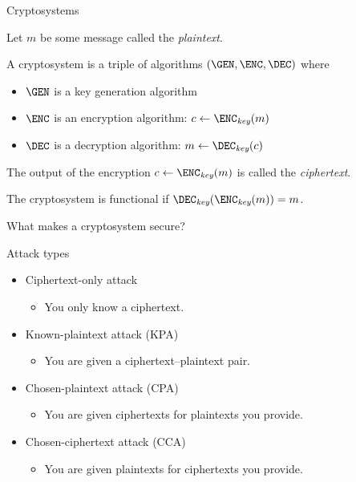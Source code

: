 \begin{frame}{Cryptosystems}

  \pause
  Let $m$ be some message called the \emph{plaintext}.

  \vspace*{1em}

  \pause
  A cryptosystem is a triple of algorithms $(\GEN,\ENC,\DEC)$ where
  \begin{itemize}[<+(1)->]
    \item $\GEN$ is a key generation algorithm
    \item $\ENC$ is an encryption algorithm: $c\gets\ENC_{\textit{key}}(m)$
    \item $\DEC$ is a decryption algorithm: $m\gets\DEC_{\textit{key}}(c)$
  \end{itemize}

  \vspace*{1em}

  \pause
  The output of the encryption $c\gets\ENC_{\textit{key}}(m)$ is called the \emph{ciphertext}.

  \vspace*{1em}

  \pause
  The cryptosystem is functional if $\DEC_{\textit{key}}(\ENC_{\textit{key}}(m))=m$.
\end{frame}

\begin{frame}[c]
  \centering
  What makes a cryptosystem secure?
\end{frame}

\begin{frame}{Attack types}

  \begin{itemize}[<+(1)->]
    \item Ciphertext-only attack
    \begin{itemize}
      \item You only know a ciphertext.
    \end{itemize}
    \item Known-plaintext attack (KPA)
    \begin{itemize}
      \item You are given a ciphertext--plaintext pair.
    \end{itemize}
    \item Chosen-plaintext attack (CPA)
    \begin{itemize}
      \item You are given ciphertexts for plaintexts you provide.
    \end{itemize}
    \item Chosen-ciphertext attack (CCA)
    \begin{itemize}
      \item You are given plaintexts for ciphertexts you provide.
    \end{itemize}
  \end{itemize}
\end{frame}

